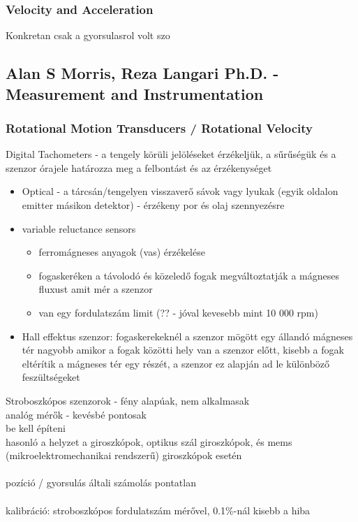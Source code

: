 \documentclass{article}
\begin{document}
	
	\subsubsection {Velocity and Acceleration}
	Konkretan csak a gyorsulasrol volt szo
	
	\subsection{Alan S Morris, Reza Langari Ph.D. - Measurement and Instrumentation}
	
	\subsubsection{Rotational Motion Transducers / Rotational Velocity}
	
	Digital Tachometers - a tengely körüli jelöléseket érzékeljük, a sűrűségük és a szenzor órajele határozza meg a felbontást és az érzékenységet
	
	\begin{itemize}
		\item Optical - a tárcsán/tengelyen visszaverő sávok vagy lyukak (egyik oldalon emitter másikon detektor) - érzékeny por és olaj szennyezésre
		\item variable reluctance sensors
		\begin{itemize}
			\item ferromágneses anyagok (vas) érzékelése
			\item fogaskeréken a távolodó és közeledő fogak megváltoztatják a mágneses fluxust amit mér a szenzor
			\item van egy fordulatszám limit (?? - jóval kevesebb mint 10 000 rpm)
		\end{itemize}
		\item Hall effektus szenzor:  fogaskerekeknél a szenzor mögött egy állandó mágneses tér nagyobb amikor a fogak közötti hely van a szenzor előtt, kisebb a fogak eltérítik a mágneses tér egy részét, a szenzor ez alapján ad le különböző feszültségeket
	\end{itemize}
	Stroboszkópos szenzorok - fény alapúak, nem alkalmasak \\
	analóg mérők - kevésbé pontosak\\
	be kell építeni\\
	hasonló a helyzet a giroszkópok, optikus szál giroszkópok, és mems (mikroelektromechanikai rendszerű) giroszkópok esetén\\
	\\
	pozíció / gyorsulás általi számolás pontatlan\\
	\\
	kalibráció: stroboszkópos fordulatszám mérővel, 0.1\%-nál kisebb a hiba\\
	
\end{document}
